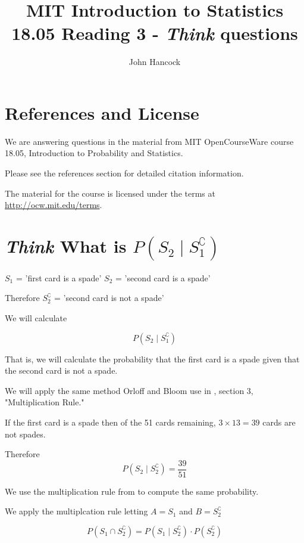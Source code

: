 \documentclass[a4paper,11pt]{article}
\author{John Hancock}
\title{MIT Introduction to Statistics 18.05 Reading 3 - 
\textit{Think} questions }
\begin{document}
\maketitle
\tableofcontents
\section{References and License}
We are answering questions in the material from MIT OpenCourseWare
course 18.05, Introduction to Probability and Statistics.

Please see the references section for detailed citation information.

The material for the course is licensed under the terms at 
\url{http://ocw.mit.edu/terms}.

\section{\textit{Think} What is $P\left(S_{2} \mid S_{1}^{\complement}\right)$}

$S_{1}$ = 'first card is a spade'
$S_{2}$ = 'second card is a spade'

Therefore $S_{2}^{\complement}$  = 'second card is not a spade'

We will calculate

\begin{equation}
  P\left(S_{2} \mid S_{1}^{\complement}\right)
\end{equation}

That is, we will calculate the probability that the first card is a
spade given that the second card is not a spade.

We will apply the same method Orloff and Bloom use in \cite{reading3}, 
section 3, "Multiplication Rule."

If the first card is a spade then of the 51 cards remaining, 
$3 \times 13 = 39$ cards are not spades.

Therefore 
\begin{equation} \label{s1S2Condish}
  P\left(S_{2} \mid S_{2}^{\complement}\right) = \frac{39}{51}
\end{equation}

We use the multiplication rule from \cite{reading3} 
to compute the same probability.

We apply the multiplcation rule letting $A=S_{1}$ and $B=S_{2}^{\complement}$

\begin{equation} \label{multRule}
  P\left(S_{1} \cap S_{2}^{\complement}\right) =
  P\left(S_{1} \mid S_{2}^{\complement}\right) \cdot 
  P\left(S_{2}^{\complement}\right)
\end{equation}
\end{document}
